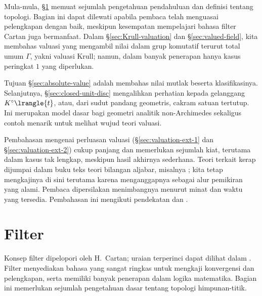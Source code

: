 \begin{wenxintishi}
	Mula-mula, \S\ref{sec:filters} memuat sejumlah pengetahuan pendahuluan dan definisi tentang topologi. Bagian ini dapat dilewati apabila pembaca telah menguasai pelengkapan dengan baik, meskipun kesempatan mempelajari bahasa filter Cartan juga bermanfaat. Dalam \S\ref{sec:Krull-valuation} dan \S\ref{sec:valued-field}, kita membahas valuasi yang mengambil nilai dalam grup komutatif terurut total umum $\Gamma$, yakni valuasi Krull; namun, dalam banyak penerapan hanya kasus peringkat $1$ yang diperlukan.
	
	Tujuan \S\ref{sec:absolute-value} adalah membahas nilai mutlak beserta klasifikasinya. Selanjutnya, \S\ref{sec:closed-unit-disc} mengalihkan perhatian kepada gelanggang $K^\circ \lrangle{t}$, atau, dari sudut pandang geometris, cakram satuan tertutup. Ini merupakan model dasar bagi geometri analitik non-Archimedes sekaligus contoh menarik untuk melihat wujud teori valuasi.

	Pembahasan mengenai perluasan valuasi (\S\ref{sec:valuation-ext-1} dan \S\ref{sec:valuation-ext-2}) cukup panjang dan memerlukan sejumlah kiat, terutama dalam kasus tak lengkap, meskipun hasil akhirnya sederhana. Teori terkait kerap dijumpai dalam buku teks teori bilangan aljabar, misalnya \cite{Lai16}; kita tetap mengkajinya di sini terutama karena menganggapnya sebagai alur pemikiran yang alami. Pembaca dipersilakan menimbangnya menurut minat dan waktu yang tersedia. Pembahasan ini mengikuti pendekatan \cite[Chapter XII]{Lang02} dan \cite[Chapter II]{Neu99}.
\end{wenxintishi}

\section{Filter}\label{sec:filters}
Konsep filter dipelopori oleh H.\ Cartan; uraian terperinci dapat dilihat dalam \cite{Bou-Top1}. Filter menyediakan bahasa yang sangat ringkas untuk mengkaji konvergensi dan pelengkapan, serta memiliki banyak penerapan dalam logika matematika. Bagian ini memerlukan sejumlah pengetahuan dasar tentang topologi himpunan-titik.


